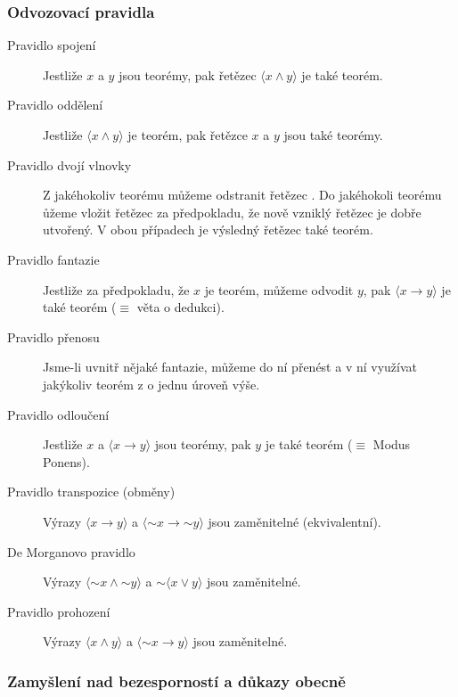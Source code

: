 \documentclass[12pt]{article}
\newcommand{\vnot}[1]{\ensuremath{{\sim}#1}}
\begin{document}
\subsubsection{Odvozovací pravidla}
\begin{description}
    \item[Pravidlo spojení] Jestliže $x$ a $y$ jsou teorémy, pak řetězec
        $\langle x \land y \rangle$ je také teorém.
    
    \item[Pravidlo oddělení] Jestliže $\langle x \land y \rangle$ je teorém,
        pak řetězce $x$ a $y$ jsou také teorémy.

    \item[Pravidlo dvojí vlnovky] Z jakéhokoliv teorému můžeme odstranit
        řetězec \uv{$\sim\sim$}. Do jakéhokoli teorému ůžeme vložit řetězec \uv{$\sim\sim$} za
        předpokladu, že nově vzniklý řetězec je dobře utvořený. V obou případech je
        výsledný řetězec také teorém.

    \item[Pravidlo fantazie] Jestliže za předpokladu, že $x$ je teorém, můžeme odvodit
        $y$, pak $\langle x \rightarrow y \rangle$ je také teorém ($\equiv$ věta o dedukci).

    \item[Pravidlo přenosu] Jsme-li uvnitř nějaké fantazie, můžeme do ní přenést
        a v ní využívat jakýkoliv teorém z  o jednu úroveň výše.

    \item[Pravidlo odloučení] Jestliže $x$ a $\langle x \rightarrow y \rangle$ jsou
        teorémy, pak $y$ je také teorém ($\equiv$ Modus Ponens).

    \item[Pravidlo transpozice (obměny)] Výrazy $\langle x \rightarrow y \rangle$
        a $\langle \vnot{x} \rightarrow \vnot{y} \rangle$ jsou zaměnitelné (ekvivalentní).

    \item[De Morganovo pravidlo] Výrazy $\langle \vnot{x} \land \vnot{y} \rangle$ a
        $\vnot{\langle x \lor y \rangle}$ jsou zaměnitelné.

    \item[Pravidlo prohození] Výrazy $\langle x \land y \rangle$ a
        $\langle \vnot{x} \rightarrow y \rangle$ jsou zaměnitelné.
\end{description}

\subsubsection{Zamyšlení nad bezesporností a důkazy obecně}
\end{document}
